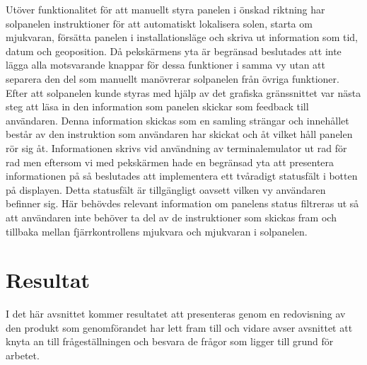 \documentclass{article}
\begin{document}
            \noindent Utöver funktionalitet för att manuellt styra panelen i önskad riktning har solpanelen instruktioner för att automatiskt lokalisera solen, starta om mjukvaran, försätta panelen i installationsläge och skriva ut information som tid, datum och geoposition. Då pekskärmens yta är begränsad beslutades att inte lägga alla motsvarande knappar för dessa funktioner i samma vy utan att separera den del som manuellt manövrerar solpanelen från övriga funktioner.\\

            \noindent Efter att solpanelen kunde styras med hjälp av det grafiska gränssnittet var nästa steg att läsa in den information som panelen skickar som feedback till användaren. Denna information skickas som  en samling strängar och innehållet består av den instruktion som användaren har skickat och åt vilket håll panelen rör sig åt. 
            Informationen skrivs vid användning av terminalemulator ut rad för rad men eftersom vi med pekskärmen hade en begränsad yta att presentera informationen på så beslutades att implementera ett tvåradigt statusfält i botten på displayen. Detta statusfält är tillgängligt oavsett vilken vy användaren befinner sig.
            Här behövdes relevant information om panelens status filtreras ut så att användaren inte behöver ta del av de instruktioner som skickas fram och tillbaka mellan fjärrkontrollens mjukvara och mjukvaran i solpanelen. \\





    \newpage

    \section{Resultat} %
    \label{sec:resultat}
        I det här avsnittet kommer resultatet att presenteras genom en redovisning av den produkt som genomförandet har lett fram till och 
        vidare avser avsnittet att knyta an till frågeställningen och besvara de frågor som ligger till grund för arbetet. \\
\end{document}

